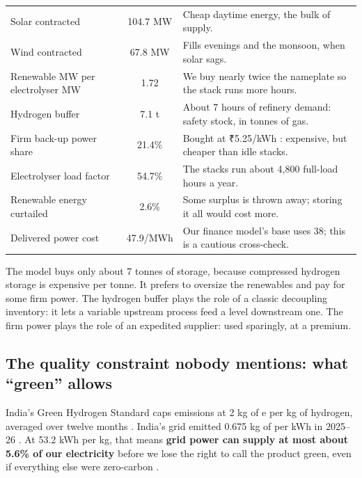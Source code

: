 \begin{center}\tablefont
\begin{tabularx}{\textwidth}{@{}L c L@{}}
\toprule
{} &  & \\ \midrule
Solar contracted & 104.7 MW & Cheap daytime energy, the bulk of supply.\\
Wind contracted & 67.8 MW & Fills evenings and the monsoon, when solar sags.\\
Renewable MW per electrolyser MW & 1.72 & We buy nearly twice the nameplate so the stack runs more hours.\\
Hydrogen buffer & 7.1 t & About 7 hours of refinery demand: safety stock, in tonnes of gas.\\
Firm back-up power share & 21.4\% & Bought at ₹5.25/kWh \cite{pvmfdre2026}: expensive, but cheaper than idle stacks.\\
Electrolyser load factor & 54.7\% & The stacks run about 4,800 full-load hours a year.\\
Renewable energy curtailed & 2.6\% & Some surplus is thrown away; storing it all would cost more.\\
Delivered power cost & \usd{}47.9/MWh & Our finance model's base uses \usd{}38; this is a cautious cross-check.\\
\bottomrule
\end{tabularx}
\end{center}

\begin{finding}
The model buys only about 7 tonnes of storage, because compressed hydrogen storage is expensive per tonne. It prefers to oversize the renewables and pay for some firm power. The hydrogen buffer plays the role of a classic decoupling inventory: it lets a variable upstream process feed a level downstream one. The firm power plays the role of an expedited supplier: used sparingly, at a premium. \confM
\end{finding}

\subsection{The quality constraint nobody mentions: what ``green'' allows}
India's Green Hydrogen Standard caps emissions at 2 kg of \coo{}e per kg of hydrogen, averaged over twelve months \cite{drishti2023}. India's grid emitted 0.675 kg of \coo{} per kWh in 2025--26 \cite{cea2026} \rep. At 53.2 kWh per kg, that means \textbf{grid power can supply at most about 5.6\% of our electricity} before we lose the right to call the product green, even if everything else were zero-carbon \estd.

